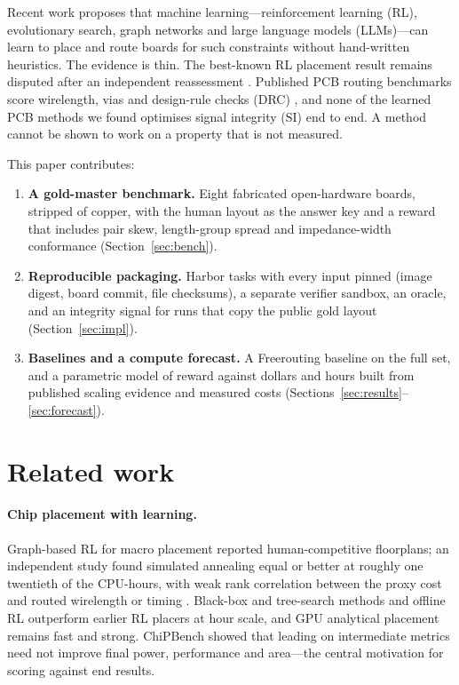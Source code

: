 \documentclass[11pt]{article}
\begin{document}
Recent work proposes that machine learning---reinforcement learning (RL), evolutionary search, graph networks and large language models (LLMs)---can learn to place and route boards for such constraints without hand-written heuristics. The evidence is thin. The best-known RL placement result \citep{mirhoseini2021graph} remains disputed after an independent reassessment \citep{cheng2023assessment,goldie2024chip,markov2024reevaluating}. Published PCB routing benchmarks score wirelength, vias and design-rule checks (DRC) \citep{song2026pcbworld}, and none of the learned PCB methods we found optimises signal integrity (SI) end to end. A method cannot be shown to work on a property that is not measured.

This paper contributes:
\begin{enumerate}
\item \textbf{A gold-master benchmark.} Eight fabricated open-hardware boards, stripped of copper, with the human layout as the answer key and a reward that includes pair skew, length-group spread and impedance-width conformance (Section~\ref{sec:bench}).
\item \textbf{Reproducible packaging.} Harbor tasks \citep{harbor} with every input pinned (image digest, board commit, file checksums), a separate verifier sandbox, an oracle, and an integrity signal for runs that copy the public gold layout (Section~\ref{sec:impl}).
\item \textbf{Baselines and a compute forecast.} A Freerouting baseline on the full set, and a parametric model of reward against dollars and hours built from published scaling evidence and measured costs (Sections~\ref{sec:results}--\ref{sec:forecast}).
\end{enumerate}

\section{Related work}
\paragraph{Chip placement with learning.} Graph-based RL for macro placement \citep{mirhoseini2021graph} reported human-competitive floorplans; an independent study found simulated annealing equal or better at roughly one twentieth of the CPU-hours, with weak rank correlation between the proxy cost and routed wirelength or timing \citep{cheng2023assessment}. Black-box and tree-search methods \citep{shi2023wiremask,geng2024efficientplace} and offline RL \citep{lai2023chipformer} outperform earlier RL placers \citep{lai2022maskplace} at hour scale, and GPU analytical placement \citep{lin2019dreamplace} remains fast and strong. ChiPBench \citep{wang2024chipbench} showed that leading on intermediate metrics need not improve final power, performance and area---the central motivation for scoring against end results.
\end{document}
